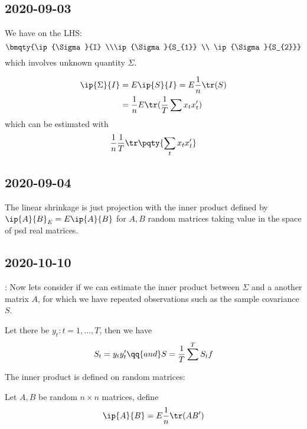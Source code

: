\subsection{2020-09-03}

We have on the LHS: 
\begin{equation}
    \bmqty{\ip{\Sigma}{I} \\\ip{\Sigma}{S_{1}} \\ \ip{\Sigma}{S_{2}}}
\end{equation} 
which involves unknown quantity \(\Sigma\).

\begin{align}
    \ip{\Sigma}{I}& = E \ip{S}{I} = E \frac{1}{n} \tr(S) \\
    &= \frac{1}{n} E \tr(\frac{1}{T} \sum x_{t}x_{t}')
\end{align}
which can be estimated with 
\begin{equation}
    \frac{1}{n} \frac{1}{T} \tr \pqty{\sum_{t} x_{t} x_{t}'}
\end{equation}

\subsection{2020-09-04}
The linear shrinkage is just projection with the inner product defined by \(\ip{A}{B}_{E} = E \ip{A}{B}\) for \(A, B\) random matrices taking value in the space of psd real matrices. 

\subsection{2020-10-10}:
Now lets consider if we can estimate the inner product between \(\Sigma\) and a another matrix \(A\), for which we have repeated observations such as the sample covariance \(S\). 

Let there be \(y_{t}: t = 1,\dots,T\), then we have 
\begin{equation*}
    S_{t} = y_{t} y_{t}' \qq{and} S = \frac{1}{T} \sum^{T} S_{t}f
\end{equation*}

The inner product is defined on random matrices: 
\begin{defn}
    Let \(A, B\) be random \(n\times n\) matrices, define 
    \begin{equation*}
        \ip{A}{B} = E \frac{1}{n} \tr(AB')
    \end{equation*}
\end{defn}

